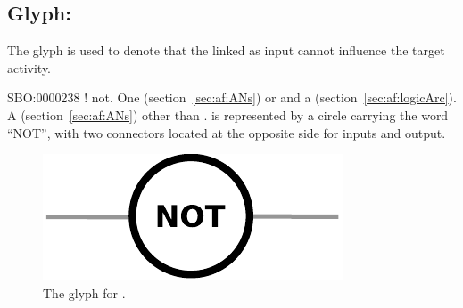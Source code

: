 \subsection{Glyph: }
\label{sec:af:not}

The glyph  is used to denote that the  linked as input cannot influence the target activity.

\begin{glyphDescription}
 \glyphSboTerm SBO:0000238 ! not.
 \glyphOrigin One  (section~\ref{sec:af:ANs}) or and a  (section~\ref{sec:af:logicArc}).
 \glyphTarget A  (section~\ref{sec:af:ANs}) other than .
 \glyphNode {} is represented by a circle carrying the word ``NOT'', with two connectors located at the opposite side for inputs and output.
 \end{glyphDescription}

\begin{figure}[H]
  \centering
  \includegraphics[scale = 0.5]{images/not}
  \caption{The \AF glyph for .}
  \label{fig:af:not}
\end{figure}
